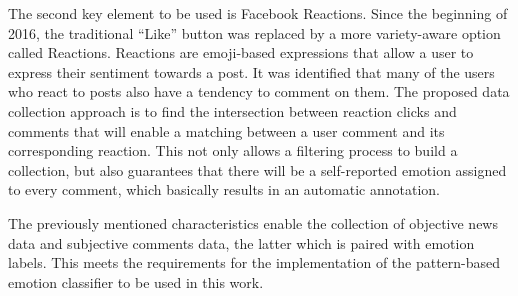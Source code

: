 \documentclass[12pt,a4paper]{report}
\theoremstyle{definition}
\begin{document}
\begin{CJK}{UTF8}{bsmi}
    \par The second key element to be used is Facebook Reactions. Since the beginning of 2016, the traditional “Like” button was replaced by a more variety-aware option called Reactions. Reactions are emoji-based expressions that allow a user to express their sentiment towards a post. It was identified that many of the users who react to posts also have a tendency to comment on them. The proposed data collection approach is to find the intersection between reaction clicks and comments that will enable a matching between a user comment and its corresponding reaction. This not only allows a filtering process to build a collection, but also guarantees that there will be a self-reported emotion assigned to every comment, which basically results in an automatic annotation.
    
    \par The previously mentioned characteristics enable the collection of objective news data and subjective comments data, the latter which is paired with emotion labels. This meets the requirements for the implementation of the pattern-based emotion classifier to be used in this work.
    
    
    

\end{CJK}
\end{document}
